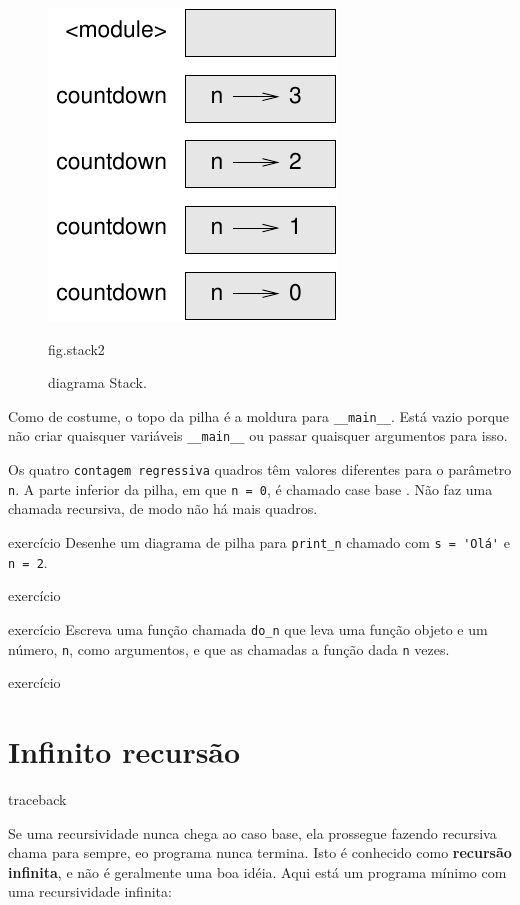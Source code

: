 \documentclass[10pt]{book}
\begin{document}
{\begin{figure}
\centerline
{\includegraphics[scale = 0.8] {figs/stack2.pdf}}
\caption{diagrama Stack.}
\label{} fig.stack2
\end{figure}


Como de costume, o topo da pilha é a moldura para \verb "__main__".
Está vazio porque não criar quaisquer variáveis 
\Verb "__main__" ou passar quaisquer argumentos para isso.

Os quatro {\tt contagem regressiva} quadros têm valores diferentes para o
parâmetro {\tt n}. A parte inferior da pilha, em que {\tt n = 0}, é
chamado {case base \bf}. Não faz uma chamada recursiva, de modo
não há mais quadros.

\begin{} exercício
Desenhe um diagrama de pilha para \verb "print_n" chamado com
\verb "s = 'Olá'" e {\tt n = 2}.
\end{} exercício

\begin{} exercício
Escreva uma função chamada \verb "do_n" que leva uma função
objeto e um número, {\tt n}, como argumentos, e que as chamadas
a função dada {\tt n} vezes.
\end{} exercício



\section{Infinito recursão}
\index{} traceback

Se uma recursividade nunca chega ao caso base, ela prossegue fazendo
recursiva chama para sempre, eo programa nunca termina. Isto é
conhecido como {\bf recursão infinita}, e não é geralmente
uma boa idéia. Aqui está um programa mínimo com uma recursividade infinita:

}
\end{document}
